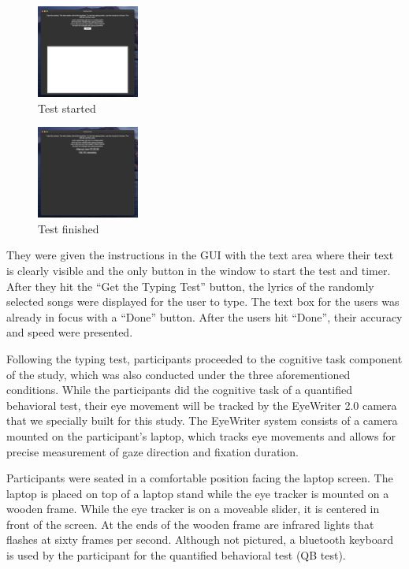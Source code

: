 \documentclass[manuscript, screen, review]{acmart} %
\begin{document}
\begin{figure}
  \includegraphics[width=0.3\textwidth]{typing_test_2}
  \caption{Test started}
\end{figure}

\begin{figure}
  \includegraphics[width=0.3\textwidth]{typing_test_3}
  \caption{Test finished}
\end{figure}

They were given the instructions in the GUI with the text area where their text is clearly visible and the only button in the window to start the test and timer. After they hit the ``Get the Typing Test'' button, the lyrics of the randomly selected songs were displayed for the user to type. The text box for the users was already in focus with a ``Done'' button. After the users hit ``Done'', their accuracy and speed were presented.

Following the typing test, participants proceeded to the cognitive task component of the study, which was also conducted under the three aforementioned conditions. While the participants did the cognitive task of a quantified behavioral test, their eye movement will be tracked by the EyeWriter 2.0 camera that we specially built for this study. The EyeWriter system consists of a camera mounted on the participant's laptop, which tracks eye movements and allows for precise measurement of gaze direction and fixation duration.

Participants were seated in a comfortable position facing the laptop screen. The laptop is placed on top of a laptop stand while the eye tracker
is mounted on a wooden frame. While the eye tracker is on a moveable slider, it is centered in front of the screen. At the ends of the wooden
frame are infrared lights that flashes at sixty frames per second. %
Although not pictured, a bluetooth keyboard is used by the participant for the quantified behavioral test (QB test).
\end{document}
